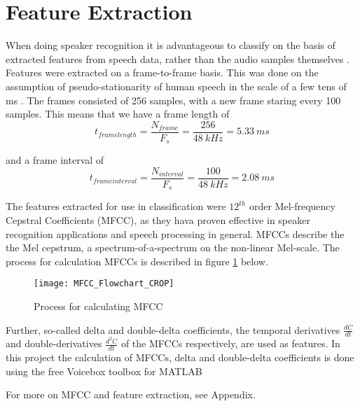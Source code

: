 \section*{Feature Extraction}
When doing speaker recognition it is advantageous to classify on the basis of extracted features from speech data, rather than the audio samples themselves \cite{Springer:36}.
Features were extracted on a frame-to-frame basis.
This was done on the assumption of pseudo-stationarity of human speech in the scale of a few tens of ms \cite{Springer:36}.
The frames consisted of 256 samples, with a new frame staring every 100 samples.
This means that we have a frame length of
\begin{equation}
t_{frame length} = \dfrac{N_{frame}}{F_s} = \dfrac{256}{48\ kHz} = 5.33\ ms
\end{equation}

and a frame interval of
\begin{equation}
t_{frame interval} = \dfrac{N_{interval}}{F_s} = \dfrac{100}{48\ kHz} = 2.08\ ms
\end{equation}

The features extracted for use in classification were $12^{th}$ order Mel-frequency Cepstral Coefficients (MFCC), as they hava proven effective in speaker recognition applications and speech processing in general.
MFCCs describe the the Mel cepstrum, a spectrum-of-a-spectrum on the non-linear Mel-scale.
The process for calculation MFCCs is described in figure \ref{fig:MFCC_Flowchart} below.

\begin{figure}[H]
\centering
\texttt{[image: MFCC\_Flowchart\_CROP]}
\caption{Process for calculating MFCC}
\label{fig:MFCC_Flowchart}
\end{figure}

Further, so-called delta and double-delta coefficients, the temporal derivatives $ \frac{dC}{dt} $ and double-derivatives $\frac{d^2C}{dt}$ of the MFCCs respectively, are used as features.
In this project the calculation of MFCCs, delta and double-delta coefficients is done using the free Voicebox toolbox for MATLAB \cite{voicebox}

For more on MFCC and feature extraction, see Appendix.
